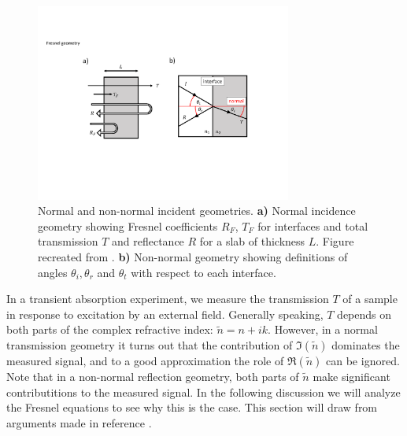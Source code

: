 \begin{figure}
	\centering
	\includegraphics[width=0.75\textwidth]{figures/chap1/Fresnel_Geometry.pdf}
	\caption{Normal and non-normal incident geometries. \textbf{a)} Normal incidence geometry showing Fresnel coefficients $R_F$, $T_F$ for interfaces and total transmission $T$ and reflectance $R$ for a slab of thickness $L$. Figure recreated from \cite{nichelattiComplexRefractiveIndex2002}. \textbf{b)} Non-normal geometry showing definitions of angles $\theta_i, \theta_r$ and $\theta_t$ with respect to each interface.}
	\label{fig:Fresnel_Geometry}
\end{figure}

In a transient absorption experiment, we measure the transmission $T$ of a sample in response to excitation by an external field. Generally speaking, $T$ depends on both parts of the complex refractive index: $\tilde{n} = n + i k$. However, in a normal transmission geometry it turns out that the contribution of $\Im(\tilde{n})$ dominates the measured signal, and to a good approximation the role of $\Re(\tilde{n})$ can be ignored. Note that in a non-normal reflection geometry, both parts of $\tilde{n}$ make significant contributitions to the measured signal. In the following discussion we will analyze the Fresnel equations to see why this is the case. This section will draw from arguments made in reference \cite{nichelattiComplexRefractiveIndex2002}.

